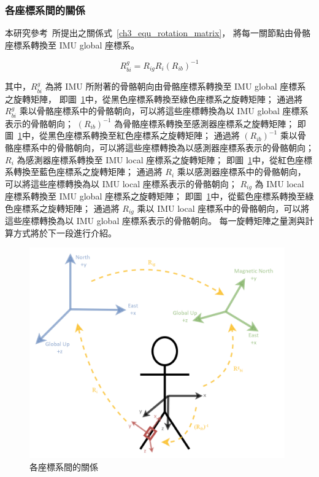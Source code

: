 \subsubsection{各座標系間的關係}
本研究參考~\cite{malleson2017real}所提出之關係式~\ref{ch3_equ_rotation_matrix}，
將每一關節點由骨骼座標系轉換至 IMU global 座標系。

\begin{equation}
   R^g_{bi}=R_{ig}R_i(R_{ib})^{-1}
   \label{ch3_equ_rotation_matrix}
\end{equation}

其中，$R^g_{bi}$ 為將 IMU 所附著的骨骼朝向由骨骼座標系轉換至 IMU global 座標系之旋轉矩陣，
即圖~\ref{ch3_fig_coordinate_trans}中，從黑色座標系轉換至綠色座標系之旋轉矩陣；
通過將 $R^g_{bi}$ 乘以骨骼座標系中的骨骼朝向，可以將這些座標轉換為以 IMU global 座標系表示的骨骼朝向；
$(R_{ib})^{-1}$ 為骨骼座標系轉換至感測器座標系之旋轉矩陣；
即圖~\ref{ch3_fig_coordinate_trans}中，從黑色座標系轉換至紅色座標系之旋轉矩陣；
通過將 $(R_{ib})^{-1}$ 乘以骨骼座標系中的骨骼朝向，可以將這些座標轉換為以感測器座標系表示的骨骼朝向；
$R_i$ 為感測器座標系轉換至 IMU local 座標系之旋轉矩陣；
即圖~\ref{ch3_fig_coordinate_trans}中，從紅色座標系轉換至藍色座標系之旋轉矩陣；
通過將 $R_i$ 乘以感測器座標系中的骨骼朝向，可以將這些座標轉換為以 IMU local 座標系表示的骨骼朝向；
$R_{ig}$ 為 IMU local 座標系轉換至 IMU global 座標系之旋轉矩陣；
即圖~\ref{ch3_fig_coordinate_trans}中，從藍色座標系轉換至綠色座標系之旋轉矩陣；
通過將 $R_{ig}$ 乘以 IMU local 座標系中的骨骼朝向，可以將這些座標轉換為以 IMU global 座標系表示的骨骼朝向。
每一旋轉矩陣之量測與計算方式將於下一段進行介紹。

\begin{figure}[!ht]
   \centering
   \includegraphics[width=11cm]{figure/ch3_fig_coordinate_trans.png}
    \caption[各座標系間的關係]{各座標系間的關係}
    \label{ch3_fig_coordinate_trans}
\end{figure}

